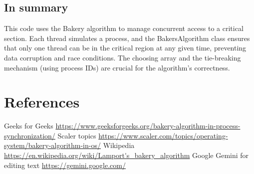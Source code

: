 \documentclass{report}
\begin{document}
\subsection{In summary}

This code uses the Bakery algorithm to manage concurrent access to a critical section. Each thread simulates a process, and the BakersAlgorithm class ensures that only one thread can be in the critical region at any given time, preventing data corruption and race conditions. The choosing array and the tie-breaking mechanism (using process IDs) are crucial for the algorithm's correctness.

\section*{References}

Geeks for Geeks \url{https://www.geeksforgeeks.org/bakery-algorithm-in-process-synchronization/}
\newline
Scaler topics \url{https://www.scaler.com/topics/operating-system/bakery-algorithm-in-os/}
\newline
Wikipedia \url{https://en.wikipedia.org/wiki/Lamport's_bakery_algorithm}
\newline
Google Gemini for editing text \url{https://gemini.google.com/}
\end{document}
